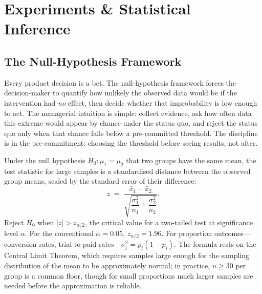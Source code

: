 \chapter{Experiments \& Statistical Inference}\label{ch:experiments-and-inference}


\section{The Null-Hypothesis Framework}\label{sec:null-hypothesis}

Every product decision is a bet. The null-hypothesis framework forces the decision-maker to
quantify how unlikely the observed data would be if the intervention had \emph{no} effect,
then decide whether that improbability is low enough to act. The managerial intuition is
simple: collect evidence, ask how often data this extreme would appear by chance under the
status quo, and reject the status quo only when that chance falls below a pre-committed
threshold. The discipline is in the pre-commitment: choosing the threshold before seeing
results, not after.

Under the null hypothesis \(H_0: \mu_1 = \mu_2\) that two groups have the same mean, the
test statistic for large samples is a standardised distance between the observed group means,
scaled by the standard error of their difference:
\begin{equation}\label{eq:z-test}
  z \;=\; \frac{\bar{x}_1 - \bar{x}_2}%
               {\sqrt{\dfrac{\sigma_1^2}{n_1}+\dfrac{\sigma_2^2}{n_2}}}.
\end{equation}
Reject \(H_0\) when \(|z| > z_{\alpha/2}\), the critical value for a two-tailed test at
significance level \(\alpha\). For the conventional \(\alpha=0.05\), \(z_{\alpha/2}=1.96\).
For proportion outcomes---conversion rates, trial-to-paid rates---\(\sigma_i^2 = p_i(1-p_i)\).
The formula rests on the Central Limit Theorem, which requires samples large enough for the
sampling distribution of the mean to be approximately normal; in practice, \(n \geq 30\)
per group is a common floor, though for small proportions much larger samples are needed
before the approximation is reliable.

